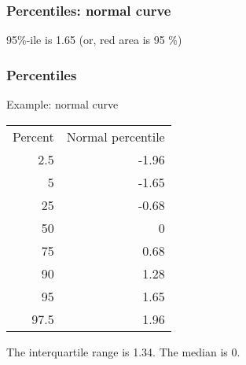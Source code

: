 \documentclass[handout]{beamer}
\begin{document}


   \begin{frame}
   \frametitle{Percentiles: normal curve}
   \begin{center}
   \end{center}
   95\%-ile is 1.65 (or, {\color{red} red area is 95 \%})
   \end{frame}


   \begin{frame} \frametitle{Percentiles}

   \begin{block}
   {Example: normal curve}

   \begin{tabular}{rr}
   Percent & Normal percentile \\
   2.5 & -1.96 \\
   5 &  -1.65 \\
   25 & -0.68 \\
   50 & 0 \\
   75 & 0.68 \\
   90 & 1.28 \\
   95 & 1.65 \\
   97.5 & 1.96 \\
   \end{tabular}

   The interquartile range is 1.34. The median is 0.

   \end{block}
   \end{frame}
\end{document}

